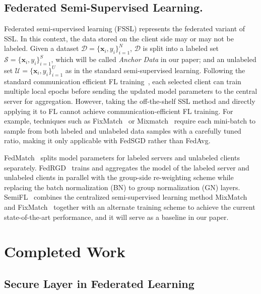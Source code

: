 \documentclass[withindex,glossary,firstyr]{cam-thesis}
\begin{document}
\section{Federated Semi-Supervised Learning.} Federated semi-supervised learning (FSSL) represents the federated variant of SSL. In this context, the data stored on the client side may or may not be labeled. Given a dataset $\mathcal{D} = \{ \textbf{x}_i,y_i \}^N_{i=1}$, $\mathcal{D}$ is split into a labeled set $\mathcal{S}= \{ \textbf{x}_i,y_i \}^S_{i=1}$, which will be called \textit{Anchor Data} in our paper; and an unlabeled set $\mathcal{U}= \{ \textbf{x}_i,y_i \}^U_{i=1}$ as in the standard semi-supervised learning. Following the standard communication efficient FL training~\citep{fedavg}, each selected client can train multiple local epochs before sending the updated model parameters to the central server for aggregation. However, taking the off-the-shelf SSL method and directly applying it to FL cannot achieve communication-efficient FL training. For example, techniques such as FixMatch~\citep{fixmatch} or Mixmatch~\citep{mixmatch} require each mini-batch to sample from both labeled and unlabeled data samples with a carefully tuned ratio, making it only applicable with FedSGD rather than FedAvg. 

FedMatch~\citep{fedmatch} splits model parameters for labeled servers and unlabeled clients separately. FedRGD~\citep{zhang2021improving} trains and aggregates the model of the labeled server and unlabeled clients in parallel with the group-side re-weighting scheme while replacing the batch normalization (BN) to group normalization (GN) layers. SemiFL~\citep{semifl} combines the centralized semi-supervised learning method MixMatch~\citep{mixmatch} and FixMatch~\citep{fixmatch} together with an alternate training scheme to achieve the current state-of-the-art performance, and it will serve as a baseline in our paper.

\chapter{Completed Work} \label{YearOne}
\section{Secure Layer in Federated Learning}

\end{document}

